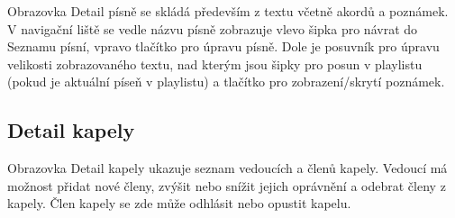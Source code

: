 Obrazovka Detail písně se skládá především z textu včetně akordů a poznámek. V navigační liště se vedle názvu písně zobrazuje vlevo šipka pro návrat do Seznamu písní, vpravo tlačítko pro úpravu písně. Dole je posuvník pro úpravu velikosti zobrazovaného textu, nad kterým jsou šipky pro posun v playlistu (pokud je aktuální píseň v playlistu) a tlačítko pro zobrazení/skrytí poznámek.

\subsection{Detail kapely}

Obrazovka Detail kapely ukazuje seznam vedoucích a členů kapely. Vedoucí má možnost přidat nové členy, zvýšit nebo snížit jejich oprávnění a odebrat členy z kapely. Člen kapely se zde může odhlásit nebo opustit kapelu.

